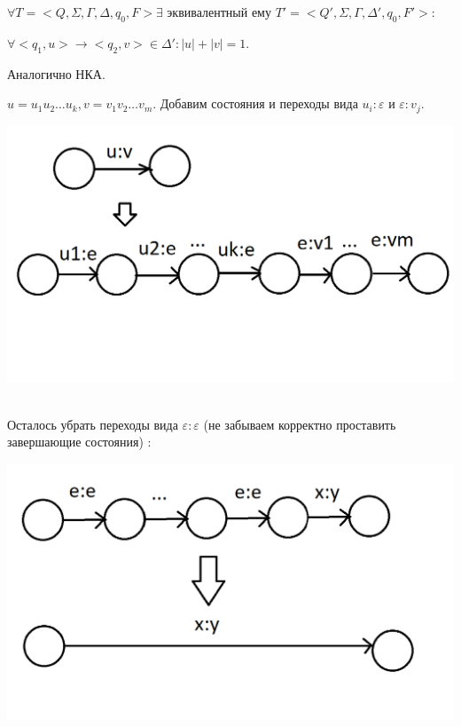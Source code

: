 \Lemma $\forall T = <Q, \Sigma, \Gamma, \Delta, q_0, F> \exists$ эквивалентный ему $T' = <Q', \Sigma, \Gamma, \Delta ', q_0, F'>:$

$\forall <q_1, u> \to <q_2, v> \in \Delta ': |u| + |v| = 1$.

\Proof
Аналогично НКА.

$u = u_1 u_2 \dots u_k, v = v_1 v_2 \dots v_m$.
Добавим состояния и переходы вида $u_i:\varepsilon$ и $\varepsilon:v_j$.

\begin{minipage}[r]{0.15\linewidth} 
    \includegraphics[width=2\linewidth]{images/29_5.png}
\end{minipage} \\

Осталось убрать переходы вида $\varepsilon:\varepsilon$ (не забываем корректно проставить завершающие состояния) :

\begin{minipage}[r]{0.15\linewidth} 
    \includegraphics[width=2\linewidth]{images/29_6.png}
\end{minipage} \\

